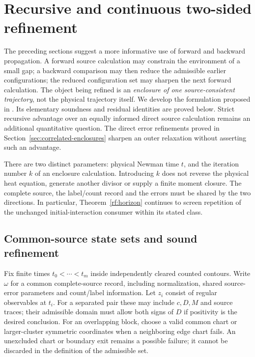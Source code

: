 \section{Recursive and continuous two-sided refinement}
\label{sec:two-sided}

The preceding sections suggest a more informative use of forward and
backward propagation. A forward source calculation may constrain the
environment of a small gap; a backward comparison may then reduce the
admissible earlier configurations; the reduced configuration set may
sharpen the next forward calculation. The object being refined is an
\emph{enclosure of one source-consistent trajectory}, not the physical
trajectory itself. We develop the formulation proposed in
\cite{BakerCM35}. Its elementary soundness and residual identities are
proved below. Strict recursive advantage over an equally informed
direct source calculation remains an additional quantitative question.
The direct error refinements proved in Section~\ref{sec:correlated-enclosures}
sharpen an outer relaxation without asserting such an advantage.

There are two distinct parameters: physical Newman time $t$, and the
iteration number $k$ of an enclosure calculation. Introducing $k$ does
not reverse the physical heat equation, generate another divisor or
supply a finite moment closure. The complete source, the label/count
record and the errors must be shared by the two directions. In
particular, Theorem~\ref{rf:horizon} continues to screen repetition
of the unchanged initial-interaction consumer within its stated class.

\subsection{Common-source state sets and sound refinement}

Fix finite times $t_0<\cdots<t_m$ inside independently cleared counted
contours. Write $\omega$ for a common complete-source record, including
normalization, shared source-error parameters and count/label information.
Let $z_i$ consist of regular observables at $t_i$. For a separated pair
these may include $c,D,M$ and source traces; their admissible domain must
allow both signs of $D$ if positivity is the desired conclusion. For an
overlapping block, choose a valid common chart or larger-cluster symmetric
coordinates when a neighboring edge chart fails. An unexcluded chart or
boundary exit remains a possible failure; it cannot be discarded in the
definition of the admissible set.

